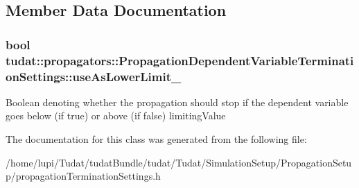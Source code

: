 \subsection{Member Data Documentation}
\subsubsection[{\texorpdfstring{use\+As\+Lower\+Limit\+\_\+}{useAsLowerLimit_}}]{\setlength{\rightskip}{0pt plus 5cm}bool tudat\+::propagators\+::\+Propagation\+Dependent\+Variable\+Termination\+Settings\+::use\+As\+Lower\+Limit\+\_\+}\hypertarget{classtudat_1_1propagators_1_1PropagationDependentVariableTerminationSettings_a7dc06eb4a8f0134d458185ef9d54a878}{}\label{classtudat_1_1propagators_1_1PropagationDependentVariableTerminationSettings_a7dc06eb4a8f0134d458185ef9d54a878}
Boolean denoting whether the propagation should stop if the dependent variable goes below (if true) or above (if false) limiting\+Value 

The documentation for this class was generated from the following file\+:\begin{DoxyCompactItemize}
\item 
/home/lupi/\+Tudat/tudat\+Bundle/tudat/\+Tudat/\+Simulation\+Setup/\+Propagation\+Setup/propagation\+Termination\+Settings.\+h\end{DoxyCompactItemize}
